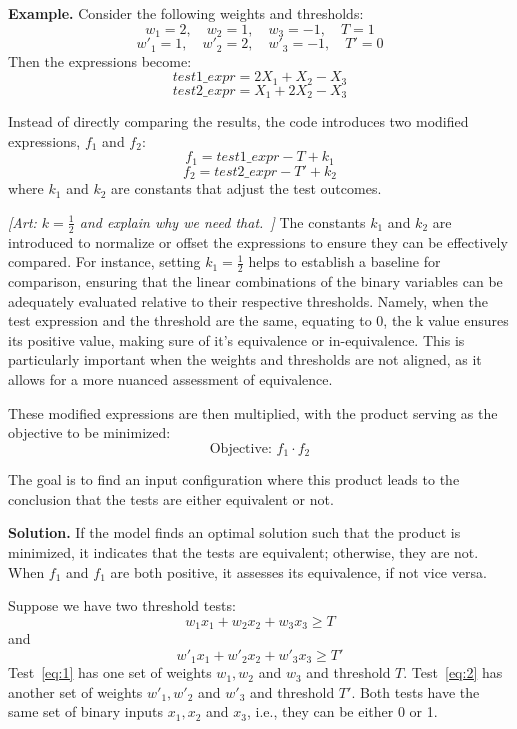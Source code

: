 \documentclass[]{article}
\newcommand{\art}[1]{{\color{red} \textit{[Art: #1~]}}}
\begin{document}
\textbf{Example.} Consider the following weights and thresholds:
\[
w_1 = 2, \quad w_2 = 1, \quad w_3 = -1, \quad T = 1
\]
\[
w'_1 = 1, \quad w'_2 = 2, \quad w'_3 = -1, \quad T' = 0
\]
Then the expressions become:
\[
test1\_expr = 2 X_1 + X_2 - X_3
\]
\[
test2\_expr = X_1 + 2 X_2 - X_3
\]

Instead of directly comparing the results, the code introduces two modified expressions, \(f_1\) and \(f_2\):
\[
f_1 = test1\_expr - T + k_1
\]
\[
f_2 = test2\_expr - T' + k_2
\]
where \(k_1\) and \(k_2\) are constants that adjust the test outcomes. 

\art{\(k = \frac{1}{2}\) and explain why we need that.}
The constants \(k_1\) and \(k_2\) are introduced to normalize or offset the expressions to ensure they can be effectively compared. For instance, setting \(k_1 = \frac{1}{2}\) helps to establish a baseline for comparison, ensuring that the linear combinations of the binary variables can be adequately evaluated relative to their respective thresholds. Namely, when the test expression and the threshold are the same, equating to 0, the k value ensures its positive value, making sure of it's equivalence or in-equivalence. This is particularly important when the weights and thresholds are not aligned, as it allows for a more nuanced assessment of equivalence.

These modified expressions are then multiplied, with the product serving as the objective to be minimized:
\[
\text{Objective: } f_1 \cdot f_2
\]

The goal is to find an input configuration where this product leads to the conclusion that the tests are either equivalent or not. 

\textbf{Solution.} If the model finds an optimal solution such that the product is minimized, it indicates that the tests are equivalent; otherwise, they are not. When \(f_1\) and \(f_1\) are both positive, it assesses its equivalence, if not vice versa.



\newpage
Suppose we have two threshold tests:
\begin{equation} \label{eq:1}
w_1 x_1 + w_2 x_2 + w_3 x_3 \ge T
\end{equation}
and
\begin{equation} \label{eq:2}
w'_1 x_1 + w'_2 x_2 + w'_3 x_3 \ge T'
\end{equation}
Test~\ref{eq:1} has one set of weights \(w_1,w_2\) and \(w_3\) and threshold \(T\).  Test~\ref{eq:2} has another set of weights \(w'_1,w'_2\) and \(w'_3\) and threshold \(T'\).  Both tests have the same set of binary inputs \(x_1,x_2\) and \(x_3\), i.e., they can be either 0 or 1.
\end{document}
